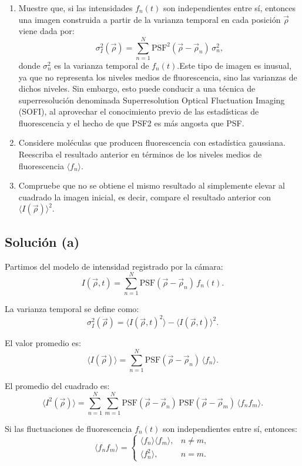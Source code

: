 \documentclass[11pt]{article}
\begin{document}
\begin{enumerate}
    \item[(a)] Muestre que, si las intensidades $f_n(t)$ son independientes entre sí, entonces 
    una imagen construida a partir de la varianza temporal en cada posición $\vec{\rho}$ viene dada por:
    \[
    \sigma_I^2(\vec{\rho}) = \sum_{n=1}^{N} \text{PSF}^2(\vec{\rho} - \vec{\rho}_n)\, \sigma_n^2,
    \]
    donde $\sigma_n^2$ es la varianza temporal de $f_n(t)$.Este tipo de imagen es inusual, ya que no representa los niveles medios de fluorescencia, sino las varianzas de dichos niveles. Sin embargo, esto puede conducir a una técnica de superresolución denominada Superresolution Optical Fluctuation Imaging (SOFI), al aprovechar el conocimiento previo de las estadísticas de fluorescencia y el hecho de que PSF2 es más angosta que PSF.

    \item[(b)] Considere moléculas que producen fluorescencia con estadística gaussiana. 
    Reescriba el resultado anterior en términos de los niveles medios de fluorescencia $\langle f_n \rangle$.

    \item[(c)] Compruebe que no se obtiene el mismo resultado al simplemente elevar al cuadrado 
    la imagen inicial, es decir, compare el resultado anterior con $\langle I(\vec{\rho}) \rangle^2$.
\end{enumerate}

\subsection*{Solución (a)}

Partimos del modelo de intensidad registrado por la cámara:
\[
I(\vec{\rho}, t) = \sum_{n=1}^{N} 
\text{PSF}(\vec{\rho} - \vec{\rho}_n)\, f_n(t).
\]

La varianza temporal se define como:
\[
\sigma_I^2(\vec{\rho}) = 
\langle I(\vec{\rho}, t)^2 \rangle -
\langle I(\vec{\rho}, t) \rangle^2.
\]

El valor promedio es:
\[
\langle I(\vec{\rho}) \rangle =
\sum_{n=1}^{N} \text{PSF}(\vec{\rho} - \vec{\rho}_n)\,
\langle f_n \rangle .
\]

El promedio del cuadrado es:
\[
\langle I^2(\vec{\rho}) \rangle
=\sum_{n=1}^{N} \sum_{m=1}^{N}
\text{PSF}(\vec{\rho} - \vec{\rho}_n)\,
\text{PSF}(\vec{\rho} - \vec{\rho}_m)\,
\langle f_n f_m \rangle.
\]

Si las fluctuaciones de fluorescencia $f_n(t)$ son independientes entre sí, entonces:
\[
\langle f_n f_m \rangle =
\begin{cases}
\langle f_n \rangle \langle f_m \rangle, & n \neq m, \\[4pt]
\langle f_n^2 \rangle, & n = m.
\end{cases}
\]
\end{document}
